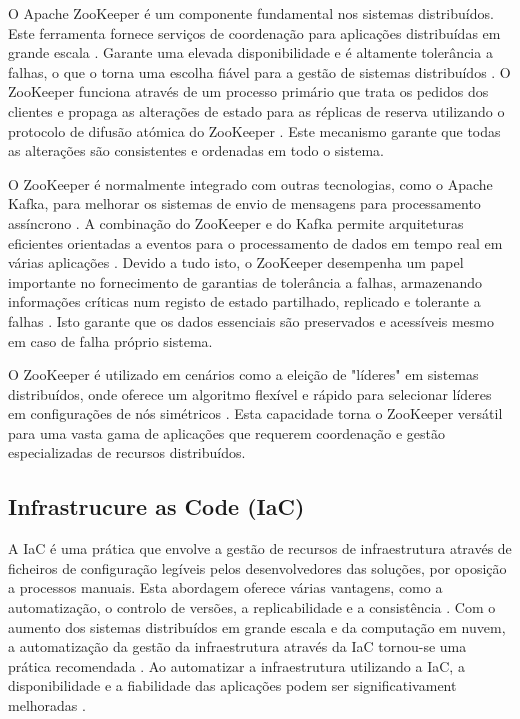 O Apache ZooKeeper é um componente fundamental nos sistemas distribuídos. Este ferramenta
fornece serviços de coordenação para aplicações distribuídas em grande escala \cite{zookeeper2018}. 
Garante uma elevada disponibilidade e é altamente tolerância a falhas, o que o torna uma escolha 
fiável para a gestão de sistemas distribuídos \cite{zookeeper2021}. O ZooKeeper funciona através de 
um processo primário que trata os pedidos dos clientes e propaga as alterações de estado para as 
réplicas de reserva utilizando o protocolo de difusão atómica do ZooKeeper \cite{zookeeper2011}. 
Este mecanismo garante que todas as alterações são consistentes e ordenadas em todo o sistema.

O ZooKeeper é normalmente integrado com outras tecnologias, como o Apache Kafka, para melhorar os 
sistemas de envio de mensagens para processamento assíncrono \cite{zookeeper2024}. A combinação do 
ZooKeeper e do Kafka permite arquiteturas eficientes orientadas a eventos para o processamento de 
dados em tempo real em várias aplicações \cite{zookeeper2021b}. Devido a tudo isto, o ZooKeeper 
desempenha um papel importante no fornecimento de garantias de tolerância a falhas, armazenando 
informações críticas num registo de estado partilhado, replicado e tolerante a falhas
\cite{zookeeper2017}. Isto garante que os dados essenciais são preservados e acessíveis mesmo
em caso de falha próprio sistema.

O ZooKeeper é utilizado em cenários como a eleição de "líderes" em sistemas distribuídos, onde 
oferece um algoritmo flexível e rápido para selecionar líderes em configurações de nós simétricos 
\cite{zookeeper2021c}. Esta capacidade torna o ZooKeeper versátil para uma vasta gama de aplicações 
que requerem coordenação e gestão especializadas de recursos distribuídos.

\subsection{Infrastrucure as Code (IaC)}

A \ac{IaC} é uma prática que envolve a gestão de recursos de infraestrutura através de ficheiros 
de configuração legíveis pelos desenvolvedores das soluções, por oposição a processos manuais. Esta 
abordagem oferece várias vantagens, como a automatização, o controlo de versões, a replicabilidade 
e a consistência \cite{iac2023}. Com o aumento dos sistemas distribuídos em grande escala 
e da computação em nuvem, a automatização da gestão da infraestrutura através da \ac{IaC} 
tornou-se uma prática recomendada \cite{iac2016}. Ao automatizar a infraestrutura utilizando a 
\ac{IaC}, a disponibilidade e a fiabilidade das aplicações podem ser significativament melhoradas 
\cite{iac2022}.

